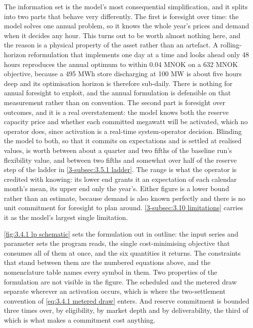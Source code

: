 The information set is the model's most consequential simplification, and it splits into two parts that behave very differently. The first is foresight over time: the model solves one annual problem, so it knows the whole year's prices and demand when it decides any hour. This turns out to be worth almost nothing here, and the reason is a physical property of the asset rather than an artefact. A rolling-horizon reformulation that implements one day at a time and looks ahead only 48 hours reproduces the annual optimum to within 0.04 MNOK on a 632 MNOK objective, because a 495 MWh store discharging at 100 MW is about five hours deep and its optimisation horizon is therefore sub-daily. There is nothing for annual foresight to exploit, and the annual formulation is defensible on that measurement rather than on convention. The second part is foresight over outcomes, and it is a real overstatement: the model knows both the reserve capacity price and whether each committed megawatt will be activated, which no operator does, since activation is a real-time system-operator decision. Blinding the model to both, so that it commits on expectations and is settled at realised values, is worth between about a quarter and two fifths of the baseline run's flexibility value, and between two fifths and somewhat over half of the reserve step of the ladder in \autoref{3-subsec:3.5.1 ladder}. The range is what the operator is credited with knowing: its lower end grants it an expectation of each calendar month's mean, its upper end only the year's. Either figure is a lower bound rather than an estimate, because demand is also known perfectly and there is no unit commitment for foresight to plan around. \autoref{3-subsec:3.10 limitations} carries it as the model's largest single limitation.

\autoref{fig:3.4.1 lp schematic} sets the formulation out in outline: the input series and parameter sets the program reads, the single cost-minimising objective that consumes all of them at once, and the six quantities it returns. The constraints that stand between them are the numbered equations above, and the nomenclature table names every symbol in them. Two properties of the formulation are not visible in the figure. The scheduled and the metered draw separate wherever an activation occurs, which is where the two-settlement convention of \autoref{eq:3.4.1 metered draw} enters. And reserve commitment is bounded three times over, by eligibility, by market depth and by deliverability, the third of which is what makes a commitment cost anything.

